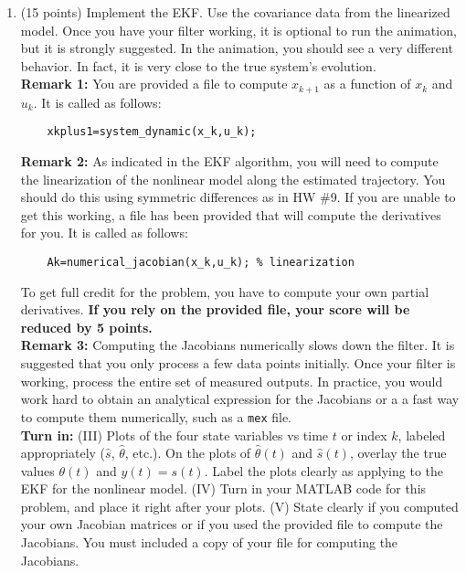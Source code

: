\documentclass[letterpaper]{article}
\begin{document}
\begin{enumerate}
\begin{enumerate}
\item (15 points) Implement the EKF. Use the covariance data from the linearized model. Once you have your filter working, it is optional to run the animation, but it is strongly suggested. In the animation, you should see a very different behavior. In fact, it is very close to the true system's evolution. \\

    \noindent \textbf{Remark 1:} You are provided a file to compute $x_{k+1}$ as a function of $x_k$ and $u_k$. It is called as follows:
    \begin{verbatim}
    xkplus1=system_dynamic(x_k,u_k);
    \end{verbatim}

    \noindent \textbf{Remark 2:} As indicated in the EKF algorithm, you will need to compute the linearization of the nonlinear model along the estimated trajectory. You should do this using symmetric differences as in HW \#9. If you are unable to get this working, a file has been provided that will compute the derivatives for you. It is called as follows:
    \begin{verbatim}
    Ak=numerical_jacobian(x_k,u_k); % linearization
    \end{verbatim}
    To get full credit for the problem, you have to compute your own partial derivatives. \textbf{If you rely on the provided file, your score will be reduced by 5 points.}\\

     \noindent \textbf{Remark 3:} Computing the Jacobians numerically slows down the filter. It is suggested that you only process a few data points initially. Once your filter is working, process the entire set of measured outputs. In practice, you would work hard to obtain an analytical expression for the Jacobians or a a fast way to compute them numerically, such as a \texttt{mex} file. \\

\noindent \textbf{Turn in:} (III) Plots of the four state variables vs time $t$ or index $k$, labeled appropriately ($\widehat{s}$, $\widehat{\theta}$, etc.).  On the plots of $\widehat{\theta}(t)$ and $\widehat{s}(t)$, overlay the true values $\theta(t)$ and $y(t)=s(t)$. Label the plots clearly as applying to the EKF for the nonlinear model. (IV) Turn in your MATLAB code for this problem, and place it right after your plots. (V) State clearly if you computed your own Jacobian matrices or if you used the provided file to compute the Jacobians. You must included a copy of your file for computing the Jacobians.

\end{enumerate}

\end{enumerate}
\end{document}
